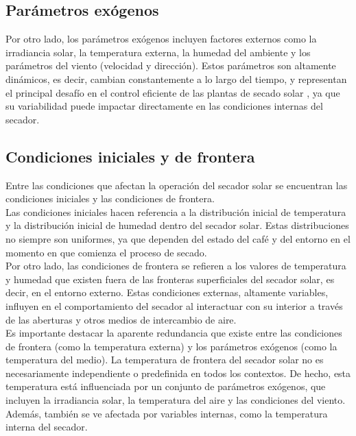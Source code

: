 \documentclass[12pt]{article}
\begin{document}
\subsection{Parámetros exógenos}
Por otro lado, los parámetros exógenos incluyen factores externos como la irradiancia solar, la temperatura externa, la humedad del ambiente y los parámetros del viento (velocidad y dirección). Estos parámetros son altamente dinámicos, es decir, cambian constantemente a lo largo del tiempo, y representan el principal desafío en el control eficiente de las plantas de secado solar \cite{friedland2005control}, ya que su variabilidad puede impactar directamente en las condiciones internas del secador.\\


\subsection{Condiciones iniciales y de frontera}
Entre las condiciones que afectan la operación del secador solar se encuentran las condiciones iniciales y las condiciones de frontera.\\

Las condiciones iniciales hacen referencia a la distribución inicial de temperatura y la distribución inicial de humedad dentro del secador solar. Estas distribuciones no siempre son uniformes, ya que dependen del estado del café y del entorno en el momento en que comienza el proceso de secado.\\

Por otro lado, las condiciones de frontera se refieren a los valores de temperatura y humedad que existen fuera de las fronteras superficiales del secador solar, es decir, en el entorno externo. Estas condiciones externas, altamente variables, influyen en el comportamiento del secador al interactuar con su interior a través de las aberturas y otros medios de intercambio de aire.\\

Es importante destacar la aparente redundancia que existe entre las condiciones de frontera (como la temperatura externa) y los parámetros exógenos (como la temperatura del medio). La temperatura de frontera del secador solar no es necesariamente independiente o predefinida en todos los contextos. De hecho, esta temperatura está influenciada por un conjunto de parámetros exógenos, que incluyen la irradiancia solar, la temperatura del aire y las condiciones del viento. Además, también se ve afectada por variables internas, como la temperatura interna del secador.\\
\end{document}
